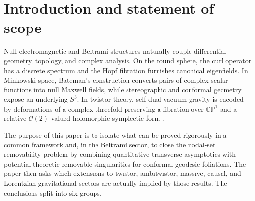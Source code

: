 \documentclass[aps,prd,reprint,nofootinbib,superscriptaddress]{revtex4-2}
\theoremstyle{definition}
\theoremstyle{remark}
\newcommand{\CP}{\mathbb{CP}}
\newcommand{\cO}{\mathcal{O}}
\begin{document}
\begin{abstract}
statement deliberately distinguished from the existence or absence of radiative solutions of the dynamical Chern--Simons wave equation. A possible ambitwistor origin of a physical pseudoscalar is formulated only as a degree-consistent research program. For the boundary problem we combine relative Chern--Weil transgression with the explicit null-hypersurface reduction of Long and Zhou: under the standard asymptotically flat falloffs the Levi--Civita Pontryagin boundary contribution at future null infinity vanishes, while gravitational helicity flux is reproduced instead by the Nieh--Yan term in the teleparallel equivalent of general relativity. This separates the dCS/Pontryagin and radiative-helicity channels at the level of the action. No cosmological, mass-generation, fine-structure, or observational prediction is inferred beyond these theorem-level statements.
\end{abstract}

\maketitle

\section{Introduction and statement of scope}

Null electromagnetic and Beltrami structures naturally couple differential geometry, topology, and complex analysis. On the round sphere, the curl operator has a discrete spectrum and the Hopf fibration furnishes canonical eigenfields. In Minkowski space, Bateman's construction converts pairs of complex scalar functions into null Maxwell fields, while stereographic and conformal geometry expose an underlying $S^3$. In twistor theory, self-dual vacuum gravity is encoded by deformations of a complex threefold preserving a fibration over $\CP^1$ and a relative $\cO(2)$-valued holomorphic symplectic form \cite{Penrose1976,HitchinKarlhede1987}.

The purpose of this paper is to isolate what can be proved rigorously in a common framework and, in the Beltrami sector, to close the nodal-set removability problem by combining quantitative transverse asymptotics with potential-theoretic removable singularities for conformal geodesic foliations. The paper then asks which extensions to twistor, ambitwistor, massive, causal, and Lorentzian gravitational sectors are actually implied by those results. The conclusions split into six groups.
\end{document}
